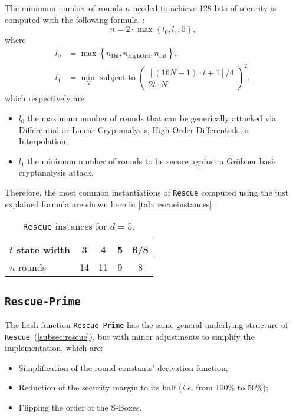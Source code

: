 \documentclass[12pt, a4paper]{report}
\begin{document}
The minimum number of rounds $n$ needed to achieve 128 bits of security is computed with the following formula~\cite[Tab.~1]{rescue}:
\begin{equation}
  n = 2 \cdot \max \left\{l_0, l_1, 5 \right\},
  \label{eq:rescuerounds}
\end{equation}
where
\begin{align}
  l_0 & = \max \left\{ n_{\text{Dif}}, n_{\text{HighOrd}}, n_{\text{Int}} \right\} , \\
  l_1 & = \min_N \text{ subject to } \left( \begin{array}{c} [(16N - 1) \cdot t + 1]/4 \\ 2t \cdot N \end{array}\right)^2 ,
\end{align}
which respectively are 
\begin{itemize}
  \item $l_0$ the maximum number of rounds that can be generically attacked via Differential or Linear Cryptanalysis, High Order Differentials or Interpolation;
  \item $l_1$ the minimum number of rounds to be secure against a Gr\"obner basis cryptanalysis attack.
\end{itemize}

Therefore, the most common instantiations of \texttt{Rescue} computed using the just explained formula are shown here in \autoref{tab:rescueinstances}:
\begin{table}[H]
  \caption{\texttt{Rescue} instances for $d = 5$.}\label{tab:rescueinstances}
  \begin{center}
    \begin{tabular}{|l|c|c|c|c|}
      \hline
      $t$ state width & 3 & 4 & 5 & 6/8 \\
      \hline
      $n$ rounds & 14 & 11 & 9 & 8 \\
      \hline
    \end{tabular}
  \end{center}
\end{table}

\subsection{\texttt{Rescue-Prime}}\label{subsec:rescueprime}

The hash function \texttt{Rescue-Prime} has the same general underlying structure of \texttt{Rescue}~(\autoref{subsec:rescue}), but with minor adjustments to simplify the implementation, which are:
\begin{itemize}
  \item Simplification of the round constants' derivation function;
  \item Reduction of the security margin to its half (\textsl{i.e.} from $100\%$ to $50\%$);
  \item Flipping the order of the S-Boxes.
\end{itemize}
\end{document}
